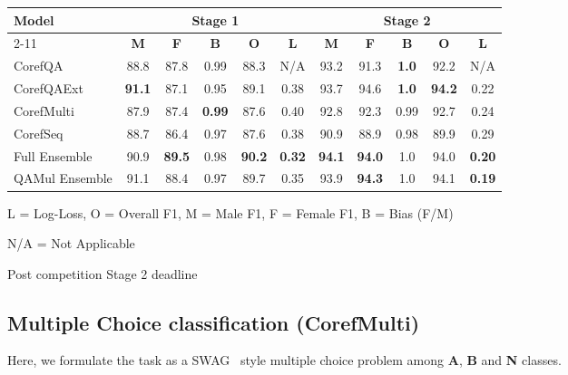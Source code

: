 \documentclass[11pt,a4paper]{article}
\begin{document}
\begin{table*}[!ht]
\begin{threeparttable}
  \centering
  \renewcommand{\arraystretch}{1.2}
  \begin{tabular}{|p{3cm}|c|c|c|c|c|c|c|c|c|c|}
    \hline
    \multirow{2}{3cm}{\textbf{Model}} & \multicolumn{5}{c|}{\textbf{Stage 1}} & \multicolumn{5}{c|}{\textbf{Stage 2}}\\
\cline{2-11}
    & \textbf{M\tnote{*}} & \textbf{F\tnote{*}} & \textbf{B\tnote{*}} & \textbf{O\tnote{*}} & \textbf{L\tnote{*}} & \textbf{M\tnote{*}} & \textbf{F\tnote{*}} & \textbf{B\tnote{*}} & \textbf{O\tnote{*}} & \textbf{L\tnote{*}}\\
\hline
    CorefQA & 88.8 & 87.8 & 0.99 & 88.3 & N/A\tnote{\#} & 93.2 & 91.3 & \textbf{1.0} & 92.2 & N/A\tnote{\#} \\ \hline
    CorefQAExt & \textbf{91.1} & 87.1 & 0.95 & 89.1 & 0.38 & 93.7 & 94.6 & \textbf{1.0} & \textbf{94.2} & 0.22 \\ \hline
    CorefMulti & 87.9 & 87.4 & \textbf{0.99} & 87.6 & 0.40 & 92.8 & 92.3 & 0.99 & 92.7 & 0.24 \\ \hline
    CorefSeq & 88.7 & 86.4 & 0.97 & 87.6 & 0.38 & 90.9 & 88.9 & 0.98 & 89.9 & 0.29  \\ \hline
    Full Ensemble & 90.9 & \textbf{89.5} & 0.98 & \textbf{90.2} & \textbf{0.32} & \textbf{94.1} & \textbf{94.0} & 1.0 & 94.0 & \textbf{0.20}  \\ \hline \hline
    QAMul Ensemble\tnote{+} & 91.1 & 88.4 & 0.97 & 89.7 & 0.35 & 93.9 & \textbf{94.3} & 1.0 & 94.1 & \textbf{0.19}  \\ \hline
  \end{tabular}
  \begin{tablenotes}\footnotesize
\item[*] L = Log-Loss, O = Overall F1, M = Male F1, F = Female F1, B = Bias (F/M)
\item[\#] N/A = Not Applicable
\item[+] Post competition Stage 2 deadline
\end{tablenotes}
  \caption{\label{results-table} Stage 1 and Stage 2 Test Results. \textbf{Bold} indicates best performance.}
  \end{threeparttable}
\end{table*}

\subsection{Multiple Choice classification (CorefMulti)}
Here, we formulate the task as a SWAG~\cite{zellers2018swag} style multiple choice problem among \textbf{A}, \textbf{B} and \textbf{N} classes.
\end{document}
